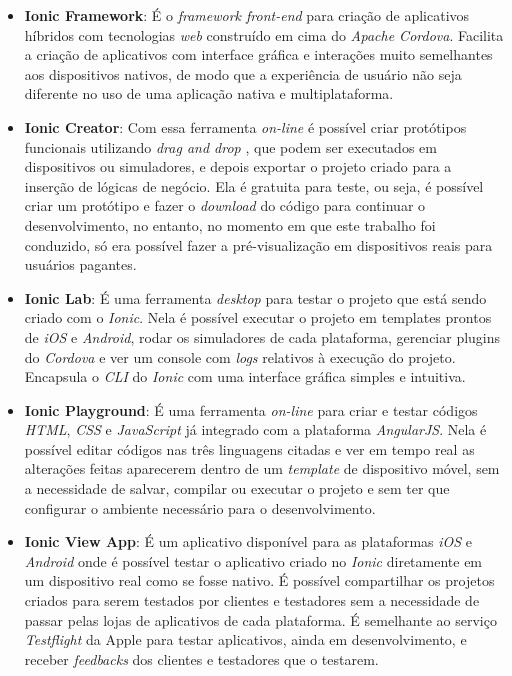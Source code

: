 \begin{itemize}

    \item \textbf{Ionic Framework}: É o \textit{framework front-end} para criação de aplicativos híbridos com tecnologias \textit{web} construído em cima
    do \textit{Apache Cordova}. Facilita a criação de aplicativos com interface gráfica e interações muito semelhantes aos dispositivos nativos, de modo que 
    a experiência de usuário não seja diferente no uso de uma aplicação nativa e multiplataforma. 
    
    \item \textbf{Ionic Creator}: Com essa ferramenta \textit{on-line} é possível criar protótipos funcionais utilizando \textit{drag and drop}
    , que podem ser executados em dispositivos ou simuladores, e depois exportar o projeto criado para a 
    inserção de lógicas de negócio. Ela é gratuita para teste, ou seja, é possível criar um protótipo e fazer o \textit{download}
    do código para continuar o desenvolvimento, no entanto, no momento em que este trabalho foi conduzido, só era possível
    fazer a pré-visualização em dispositivos reais para usuários pagantes.
    
    \item \textbf{Ionic Lab}: É uma ferramenta \textit{desktop} para testar o projeto que está sendo criado com o \textit{Ionic}. Nela é possível
    executar o projeto em templates prontos de \textit{iOS} e \textit{Android}, rodar os simuladores de cada plataforma,
    gerenciar plugins do \textit{Cordova} e ver um console com \textit{logs} relativos à execução do projeto. Encapsula o \textit{CLI} do \textit{Ionic} com uma interface gráfica simples
    e intuitiva.
    
    \item \textbf{Ionic Playground}: É uma ferramenta \textit{on-line} para criar e testar códigos \textit{HTML}, \textit{CSS} e \textit{JavaScript} 
    já integrado com a plataforma \textit{AngularJS}. Nela é possível editar códigos nas três linguagens citadas e ver em tempo real as alterações 
    feitas aparecerem dentro de um \textit{template} de dispositivo móvel, sem a necessidade de salvar, compilar ou executar o projeto e sem ter que 
    configurar o ambiente necessário para o desenvolvimento. 
    
    \item \textbf{Ionic View App}: É um aplicativo disponível para as plataformas \textit{iOS} e \textit{Android} onde é possível testar o 
    aplicativo criado no \textit{Ionic} diretamente em um dispositivo real como se fosse nativo. É possível compartilhar os projetos criados para serem
    testados por clientes e testadores sem a necessidade de passar pelas lojas de aplicativos de cada plataforma. É semelhante ao serviço 
    \textit{Testflight} da Apple para testar aplicativos, ainda em desenvolvimento, e receber \textit{feedbacks} dos clientes e testadores que o testarem.
    

\end{itemize}
